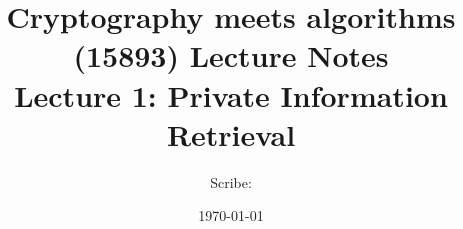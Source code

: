 \documentclass[11pt]{article}
\title{{\Large Cryptography meets algorithms (15893) Lecture Notes}\\[5pt]
{\bf Lecture 1: Private Information Retrieval}}
\author{Scribe: }
\date{\today}
\begin{document}
\maketitle


{

}
{

}
{

}
{

}
{

}





\end{document}
